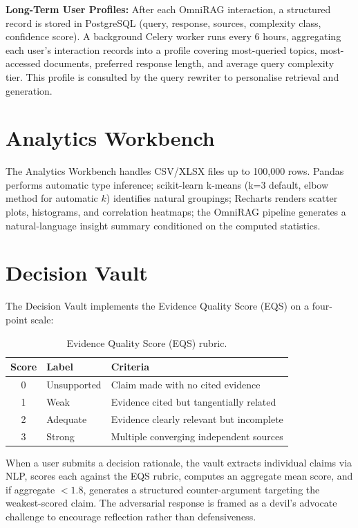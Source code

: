 \textbf{Long-Term User Profiles:} After each OmniRAG interaction, a structured record is stored in PostgreSQL (query, response, sources, complexity class, confidence score). A background Celery worker runs every 6 hours, aggregating each user's interaction records into a profile covering most-queried topics, most-accessed documents, preferred response length, and average query complexity tier. This profile is consulted by the query rewriter to personalise retrieval and generation.

\section{Analytics Workbench}
\label{sec:analytics}

The Analytics Workbench handles CSV/XLSX files up to 100,000 rows. Pandas performs automatic type inference; scikit-learn k-means (k=3 default, elbow method for automatic $k$) identifies natural groupings; Recharts renders scatter plots, histograms, and correlation heatmaps; the OmniRAG pipeline generates a natural-language insight summary conditioned on the computed statistics.

\section{Decision Vault}
\label{sec:decision-vault}

The Decision Vault implements the Evidence Quality Score (EQS) on a four-point scale:

\begin{table}[ht]
    \centering
    \caption{Evidence Quality Score (EQS) rubric.}
    \label{tab:eqs}
    \renewcommand{\arraystretch}{1.3}
    \begin{tabular}{cll}
        \toprule
        \textbf{Score} & \textbf{Label} & \textbf{Criteria} \\
        \midrule
        0 & Unsupported   & Claim made with no cited evidence \\
        1 & Weak          & Evidence cited but tangentially related \\
        2 & Adequate      & Evidence clearly relevant but incomplete \\
        3 & Strong        & Multiple converging independent sources \\
        \bottomrule
    \end{tabular}
\end{table}

When a user submits a decision rationale, the vault extracts individual claims via NLP, scores each against the EQS rubric, computes an aggregate mean score, and if aggregate $< 1.8$, generates a structured counter-argument targeting the weakest-scored claim. The adversarial response is framed as a devil's advocate challenge to encourage reflection rather than defensiveness.

